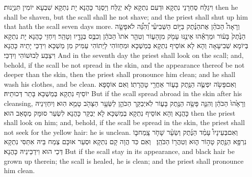 {וִיגַלַּח סַחְרָנֵי נִתְקָא וּדְעִם נִתְקָא לָא יְגַלַּח וְיַסְגַּר כָּהֲנָא יָת נִתְקָא שִׁבְעָא יוֹמִין תִּנְיָנוּת׃}
{then he shall be shaven, but the scall shall he not shave; and the priest shall shut up him that hath the scall seven days more.}{}
{וְרָאָה֩ הַכֹּהֵ֨ן אֶת\maqqaf הַנֶּ֜תֶק בַּיּ֣וֹם הַשְּׁבִיעִ֗י וְ֠הִנֵּ֠ה לֹא\maqqaf פָשָׂ֤ה הַנֶּ֙תֶק֙ בָּע֔וֹר וּמַרְאֵ֕הוּ אֵינֶ֥נּוּ עָמֹ֖ק מִן\maqqaf הָע֑וֹר וְטִהַ֤ר אֹתוֹ֙ הַכֹּהֵ֔ן וְכִבֶּ֥ס בְּגָדָ֖יו וְטָהֵֽר׃}
{וְיִחְזֵי כָהֲנָא יָת נִתְקָא בְּיוֹמָא שְׁבִיעָאָה וְהָא לָא אוֹסֵיף נִתְקָא בְּמַשְׁכָּא וּמִחְזוֹהִי לָיְתוֹהִי עַמִּיק מִן מַשְׁכָּא וִידַכֵּי יָתֵיהּ כָּהֲנָא וִיצַבַּע לְבוּשׁוֹהִי וְיִדְכֵּי׃}
{And in the seventh day the priest shall look on the scall; and, behold, if the scall be not spread in the skin, and the appearance thereof be not deeper than the skin, then the priest shall pronounce him clean; and he shall wash his clothes, and be clean.}{}
{וְאִם\maqqaf פָּשֹׂ֥ה יִפְשֶׂ֛ה הַנֶּ֖תֶק בָּע֑וֹר אַחֲרֵ֖י טׇהֳרָתֽוֹ׃}
{וְאִם אוֹסָפָא יוֹסֵיף נִתְקָא בְּמַשְׁכָּא בָּתַר דְּכוּתֵיהּ׃}
{But if the scall spread abroad in the skin after his cleansing,}{}
{וְרָאָ֙הוּ֙ הַכֹּהֵ֔ן וְהִנֵּ֛ה פָּשָׂ֥ה הַנֶּ֖תֶק בָּע֑וֹר לֹֽא\maqqaf יְבַקֵּ֧ר הַכֹּהֵ֛ן לַשֵּׂעָ֥ר הַצָּהֹ֖ב טָמֵ֥א הֽוּא׃}
{וְיִחְזֵינֵיהּ כָּהֲנָא וְהָא אוֹסֵיף נִתְקָא בְמַשְׁכָּא לָא יְבַקַּר כָּהֲנָא לִשְׂעַר סוּמָּק מְסָאַב הוּא׃}
{then the priest shall look on him; and, behold, if the scall be spread in the skin, the priest shall not seek for the yellow hair: he is unclean.}{}
{וְאִם\maqqaf בְּעֵינָיו֩ עָמַ֨ד הַנֶּ֜תֶק וְשֵׂעָ֨ר שָׁחֹ֧ר צָֽמַח\maqqaf בּ֛וֹ נִרְפָּ֥א הַנֶּ֖תֶק טָה֣וֹר ה֑וּא וְטִהֲר֖וֹ הַכֹּהֵֽן׃ \setuma }
{וְאִם כִּד הֲוָה קָם נִתְקָא וּסְעַר אוּכָּם צְמַח בֵּיהּ אִתַּסִּי נִתְקָא דְּכֵי הוּא וִידַכֵּינֵיהּ כָּהֲנָא׃}
{But if the scall stay in its appearance, and black hair be grown up therein; the scall is healed, he is clean; and the priest shall pronounce him clean.}{}
